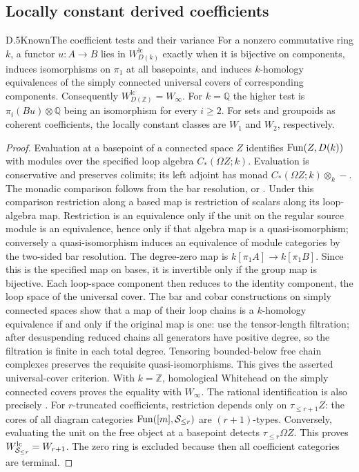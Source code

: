 \subsection{Locally constant derived coefficients}
\begin{claim}{D.5}{Known}{The coefficient tests and their variance}
For a nonzero commutative ring $k$, a functor $u:A\to B$ lies in $W_{D(k)}^{\mathrm{lc}}$ exactly when it is bijective on components, induces isomorphisms on $\pi_1$ at all basepoints, and induces $k$-homology equivalences of the simply connected universal covers of corresponding components. Consequently $W_{D(\mathbb Z)}^{\mathrm{lc}}=W_\infty$. For $k=\mathbb Q$ the higher test is $\pi_i(Bu)\otimes\mathbb Q$ being an isomorphism for every $i\geq2$. For sets and groupoids as coherent coefficients, the locally constant classes are $W_1$ and $W_2$, respectively.
\end{claim}
\begin{proof}
Evaluation at a basepoint of a connected space $Z$ identifies $\mathrm{Fun}(Z,D(k))$ with modules over the specified loop algebra $C_*(\Omega Z;k)$. Evaluation is conservative and preserves colimits; its left adjoint has monad $C_*(\Omega Z;k)\otimes_k-$. The monadic comparison follows from the bar resolution, or \citet[Theorem 4.7.3.5]{GHIJLurie2017}. Under this comparison restriction along a based map is restriction of scalars along its loop-algebra map. Restriction is an equivalence only if the unit on the regular source module is an equivalence, hence only if that algebra map is a quasi-isomorphism; conversely a quasi-isomorphism induces an equivalence of module categories by the two-sided bar resolution.
The degree-zero map is $k[\pi_1A]\to k[\pi_1B]$. Since this is the specified map on bases, it is invertible only if the group map is bijective. Each loop-space component then reduces to the identity component, the loop space of the universal cover. The bar and cobar constructions on simply connected spaces show that a map of their loop chains is a $k$-homology equivalence if and only if the original map is one: use the tensor-length filtration; after desuspending reduced chains all generators have positive degree, so the filtration is finite in each total degree. Tensoring bounded-below free chain complexes preserves the requisite quasi-isomorphisms. This gives the asserted universal-cover criterion. With $k=\mathbb Z$, homological Whitehead on the simply connected covers proves the equality with $W_\infty$. The rational identification is also precisely \citet[Theorem 3]{RRivera2021}.
For $r$-truncated coefficients, restriction depends only on $\tau_{\leq r+1}Z$: the cores of all diagram categories $\mathrm{Fun}([m],\mathcal{S}_{\leq r})$ are $(r+1)$-types. Conversely, evaluating the unit on the free object at a basepoint detects $\tau_{\leq r}\Omega Z$. This proves $W^{\mathrm{lc}}_{\mathcal{S}_{\leq r}}=W_{r+1}$. The zero ring is excluded because then all coefficient categories are terminal.
\end{proof}

